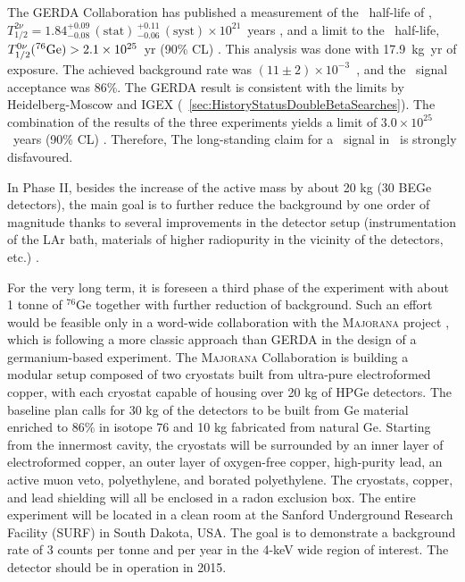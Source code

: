 \documentclass{PoS}
\begin{document}
The GERDA Collaboration has published a measurement of the \bbtnu\ half-life of \GE, $T^{2\nu}_{1/2} = 1.84^{+0.09}_{-0.08}\,(\mathrm{stat})\, ^{+0.11}_{-0.06}\,(\mathrm{syst})\times10^{21}$~years \cite{Agostini:2012nm}, and a limit to the \bbonu\ half-life, $T^{0\nu}_{1/2}(^{76}\mathrm{Ge})>2.1\times10^{25}$~yr (90\% CL) \cite{Agostini:2013mzu}. This analysis was done with 17.9~kg~yr of exposure. The achieved background rate was $(11\pm2)\times10^{-3}$~\ckky,  and the \bbonu\ signal acceptance was 86\%. The GERDA result is consistent with the limits by
Heidelberg-Moscow and IGEX (\textsection~\ref{sec:HistoryStatusDoubleBetaSearches}). The combination of the results of the three experiments yields a limit of $3.0\times10^{25}$~years (90\% CL) \cite{Agostini:2013mzu}. Therefore, The long-standing claim for a \bbonu\ signal in \GE\ is strongly disfavoured.


In Phase II, besides the increase of the active mass by about 20 kg (30 BEGe detectors), the main goal is to further reduce the background by one order of magnitude thanks to several improvements in the detector setup (instrumentation of the LAr bath, materials of higher radiopurity in the vicinity of the detectors, etc.) \cite{Macolino:2014vya}. 

For the very long term, it is foreseen a third phase of the experiment with about 1 tonne of $^{76}$Ge together with further reduction of background. Such an effort would be feasible only in a word-wide collaboration with the {\scshape Majorana} project \cite{Abgrall:2013rze}, which is following a more classic approach than GERDA in the design of a germanium-based experiment. The {\scshape Majorana} Collaboration is building a modular setup composed of two cryostats built from ultra-pure electroformed copper, with each cryostat capable of housing over 20 kg of HPGe detectors. The baseline plan calls for 30 kg of the detectors to be built from Ge material enriched to 86\% in isotope 76 and 10 kg fabricated from natural Ge. Starting from the innermost cavity, the cryostats will be surrounded by an inner layer of electroformed copper, an outer layer of oxygen-free copper, high-purity lead, an active muon veto, polyethylene, and borated polyethylene. The cryostats, copper, and lead shielding will all be enclosed in a radon exclusion box. The entire experiment will be located in a clean room at the Sanford Underground Research Facility (SURF) in South Dakota, USA. The goal is to demonstrate a background rate of 3 counts per tonne and per year in the 4-keV wide region of interest. The detector should be in operation in 2015.
\end{document}
